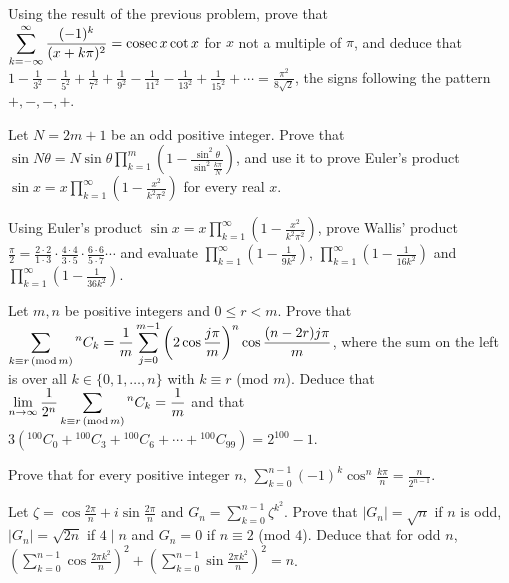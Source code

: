 \item Using the result of the previous problem, prove that $\displaystyle\sum_{k = -\infty}^{\infty}\frac{(-1)^k}{(x +
    k\pi)^2} = {\rm cosec}\,x\cot x$ for $x$ not a multiple of $\pi$, and deduce that $1 - \frac{1}{3^2}
  - \frac{1}{5^2} + \frac{1}{7^2} + \frac{1}{9^2} - \frac{1}{11^2} - \frac{1}{13^2} + \frac{1}{15^2} +
  \cdots = \frac{\pi^2}{8\sqrt{2}}$, the signs following the pattern $+, -, -, +$.
\item Let $N = 2m + 1$ be an odd positive integer. Prove that $\sin N\theta = N\sin\theta\displaystyle\prod_{k
    = 1}^m\left(1 - \frac{\sin^2\theta}{\sin^2\frac{k\pi}{N}}\right)$, and use it to prove Euler's product
  $\sin x = x\displaystyle\prod_{k = 1}^\infty\left(1 - \frac{x^2}{k^2\pi^2}\right)$ for every real $x$.
\item Using Euler's product $\sin x = x\displaystyle\prod_{k = 1}^\infty\left(1 - \frac{x^2}{k^2\pi^2}\right)$,
  prove Wallis' product $\frac{\pi}{2} = \frac{2\cdot 2}{1\cdot 3}\cdot\frac{4\cdot 4}{3\cdot
    5}\cdot\frac{6\cdot 6}{5\cdot 7}\cdots$ and evaluate $\displaystyle\prod_{k = 1}^\infty\left(1 -
    \frac{1}{9k^2}\right)$, $\displaystyle\prod_{k = 1}^\infty\left(1 - \frac{1}{16k^2}\right)$ and
  $\displaystyle\prod_{k = 1}^\infty\left(1 - \frac{1}{36k^2}\right)$.
\item Let $m, n$ be positive integers and $0\leq r < m$. Prove that $\displaystyle\sum_{k\equiv r\,({\rm
      mod}\,m)}{}^nC_k = \frac{1}{m}\sum_{j = 0}^{m - 1}\left(2\cos\frac{j\pi}{m}\right)^n\cos\frac{(n -
    2r)j\pi}{m}$, where the sum on the left is over all $k\in\{0, 1, \ldots, n\}$ with $k\equiv r$ (mod
  $m$). Deduce that $\displaystyle\lim_{n\to\infty}\frac{1}{2^n}\sum_{k\equiv r\,({\rm mod}\,m)}{}^nC_k
  = \frac{1}{m}$ and that $3\left({}^{100}C_0 + {}^{100}C_3 + {}^{100}C_6 + \cdots + {}^{100}C_{99}\right) =
  2^{100} - 1$.
\item Prove that for every positive integer $n$, $\displaystyle\sum_{k = 0}^{n - 1}(-1)^k\cos^n\frac{k\pi}{n}
  = \frac{n}{2^{n - 1}}$.
\item Let $\zeta = \cos\frac{2\pi}{n} + i\sin\frac{2\pi}{n}$ and $G_n = \displaystyle\sum_{k = 0}^{n -
    1}\zeta^{k^2}$. Prove that $|G_n| = \sqrt{n}$ if $n$ is odd, $|G_n| = \sqrt{2n}$ if $4\mid n$ and $G_n =
  0$ if $n\equiv 2$ (mod $4$). Deduce that for odd $n$, $\left(\displaystyle\sum_{k = 0}^{n -
      1}\cos\frac{2\pi k^2}{n}\right)^2 + \left(\displaystyle\sum_{k = 0}^{n - 1}\sin\frac{2\pi
      k^2}{n}\right)^2 = n$.
